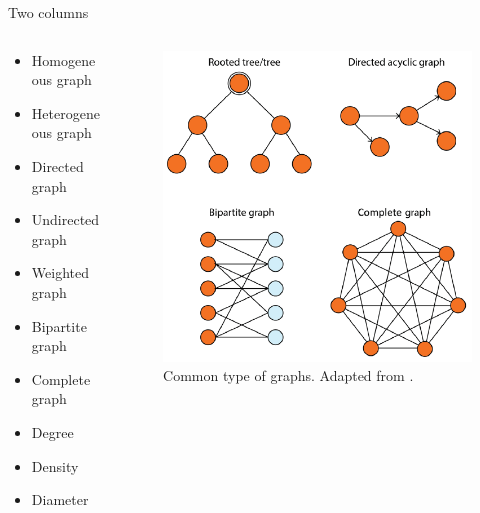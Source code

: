 \documentclass{beamer}
\begin{document}
    \begin{frame}{Two columns}
        \begin{columns}[t] %
            \begin{column}{0.5\textwidth}
                \begin{itemize}
                    \item Homogeneous graph
                    \item Heterogeneous graph
                    \item Directed graph
                    \item Undirected graph
                    \item Weighted graph
                    \item Bipartite graph
                    \item Complete graph
                    \item Degree
                    \item Density
                    \item Diameter
                \end{itemize}
            \end{column}
            
            \begin{column}{0.5\textwidth}
                \begin{figure}[ht!]
                    \centering
                    \includegraphics[width=1.0\linewidth]{pic/common_type_graph.png}
                    \caption{Common type of graphs. Adapted from \cite{labonne2023hands}.}
                    \label{fig:graph_types}
                \end{figure}
            \end{column}
        \end{columns}
        

\end{frame}
\end{document}
